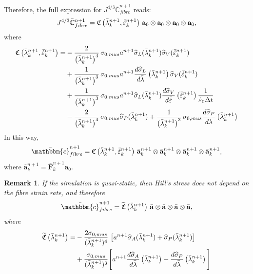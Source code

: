 \documentclass{sfuthesis}
\numberwithin{equation}{section}
\numberwithin{figure}{chapter}
\numberwithin{table}{chapter}
\newtheorem{remark}[theorem]{Remark}
\theoremstyle{definition}
\def\*#1{{\mathbf{#1}}} %
\newcommand{\der}[2]{\dfrac{d #1}{d #2}}
\newcommand{\depsilon}{\dot{\varepsilon}}
\newcommand{\C}{\mathbb{C}}
\renewcommand{\c}{\mathbbm{c}}
\begin{document}
Therefore, the full expression for $J^{4/3} \bar{\C}_{fibre}^{n+1}$ reads:
\begin{equation}
    \notag J^{4/3} \bar{\C}_{fibre}^{n+1} = \mathfrak{C}\left(\bar{\lambda}^{n+1}_k, \bar{\depsilon}^{n+1}_k \right) \, \*a_0 \otimes \*a_0 \otimes \*a_0 \otimes \*a_0,
\end{equation}
where
\begin{align}
    \notag \mathfrak{C}\left(\bar{\lambda}^{n+1}_k, \bar{\depsilon}^{n+1}_k \right) = &- \dfrac{2}{\left( \bar{\lambda}^{n+1}_k \right)^4} \, \sigma_{0,mus} a^{n+1} \widehat{\sigma}_L(\bar{\lambda}^{n+1}_k) \widehat{\sigma}_V(\bar{\depsilon}^{n+1}_k) \\
    \notag &+ \dfrac{1}{\left( \bar{\lambda}^{n+1}_k \right)^3} \, \sigma_{0,mus} a^{n+1} \der{\widehat{\sigma}_L}{\bar{\lambda}} \left( \bar{\lambda}^{n+1}_k \right) \widehat{\sigma}_V(\bar{\depsilon}^{n+1}_k) \\
    \notag &+ \dfrac{1}{\left( \bar{\lambda}^{n+1}_k \right)^3} \, \sigma_{0,mus} a^{n+1} \widehat{\sigma}_L(\bar{\lambda}^{n+1}_k) \der{\widehat{\sigma}_V}{\bar{\depsilon}} \left( \bar{\depsilon}^{n+1}_k \right) \dfrac{1}{\depsilon_0 \Delta t} \\
    &- \dfrac{2}{\left( \bar{\lambda}^{n+1}_k \right)^4} \, \sigma_{0,mus} \widehat{\sigma}_P(\bar{\lambda}^{n+1}_k) + \dfrac{1}{\left( \bar{\lambda}^{n+1}_k \right)^3} \, \sigma_{0,mus} \der{\widehat{\sigma}_P}{\bar{\lambda}} \left( \bar{\lambda}^{n+1}_k  \right)
\end{align}
In this way,
\begin{equation}
    \bar{\c}_{fibre}^{n+1} = \mathfrak{C}\left(\bar{\lambda}^{n+1}_k, \bar{\depsilon}^{n+1}_k \right) \, \bar{\*a}_k^{n+1} \otimes \bar{\*a}_k^{n+1} \otimes \bar{\*a}_k^{n+1} \otimes \bar{\*a}_k^{n+1},
\end{equation}
where $\bar{\*a}_k^{n+1} = \bar{\*F}_k^{n+1} \*a_0$.

\begin{remark}
    If the simulation is quasi-static, then Hill's stress does not depend on the fibre strain rate, and therefore
    \begin{equation}
        \bar{\c}_{fibre}^{n+1} = \widetilde{\mathfrak{C}} \left(\bar{\lambda}^{n+1}_k \right) \, \bar{\*a} \otimes \bar{\*a} \otimes \bar{\*a} \otimes \bar{\*a},
    \end{equation}
    where
    \begin{align}
        \notag \widetilde{\mathfrak{C}} \left(\bar{\lambda}^{n+1}_k \right) = &-\dfrac{2\sigma_{0,mus}}{(\bar{\lambda}^{n+1}_k)^4} \, \left[ a^{n+1} \widehat{\sigma}_A(\bar{\lambda}^{n+1}_k)  + \widehat{\sigma}_P(\bar{\lambda}^{n+1}_k) \right] \\
        &+ \dfrac{\sigma_{0,mus}}{(\bar\lambda^{n+1}_k)^3} \Bigg[ a^{n+1} \der{\widehat{\sigma}_A}{\bar\lambda}\left(\bar\lambda^{n+1}_k\right) + \der{\widehat{\sigma}_P}{\bar{\lambda}}\left(\bar\lambda^{n+1}_k\right) \Bigg]
    \end{align}
\end{remark}
\end{document}
